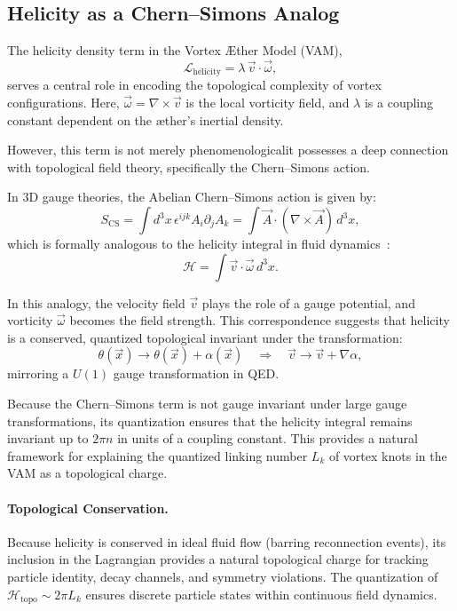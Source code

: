 \documentclass[12pt]{article}
\begin{document}
\subsection{Helicity as a Chern--Simons Analog}
The helicity density term in the Vortex \AE{}ther Model (VAM),
\begin{equation}
\mathcal{L}_{\text{helicity}} = \lambda\, \vec{v} \cdot \vec{\omega},
\end{equation}
serves a central role in encoding the topological complexity of vortex configurations. Here, $\vec{\omega} = \nabla \times \vec{v}$ is the local vorticity field, and $\lambda$ is a coupling constant dependent on the \ae{}ther's inertial density.

However, this term is not merely phenomenological\textemdash it possesses a deep connection with topological field theory, specifically the Chern--Simons action.

In 3D gauge theories, the Abelian Chern--Simons action is given by:
\begin{equation}
S_{\text{CS}} = \int d^3x\, \epsilon^{ijk} A_i \partial_j A_k = \int \vec{A} \cdot (\nabla \times \vec{A})\, d^3x,
\end{equation}
which is formally analogous to the helicity integral in fluid dynamics~\cite{moffatt1969degree, jackiw1990chern}:
\begin{equation}
\mathcal{H} = \int \vec{v} \cdot \vec{\omega}\, d^3x.
\end{equation}

In this analogy, the velocity field $\vec{v}$ plays the role of a gauge potential, and vorticity $\vec{\omega}$ becomes the field strength. This correspondence suggests that helicity is a conserved, quantized topological invariant under the transformation:
\begin{equation}
\theta(\vec{x}) \rightarrow \theta(\vec{x}) + \alpha(\vec{x}) \quad \Rightarrow \quad \vec{v} \rightarrow \vec{v} + \nabla \alpha,
\end{equation}
mirroring a $U(1)$ gauge transformation in QED.

Because the Chern--Simons term is not gauge invariant under large gauge transformations, its quantization ensures that the helicity integral remains invariant up to $2\pi n$ in units of a coupling constant. This provides a natural framework for explaining the quantized linking number $L_k$ of vortex knots in the VAM as a topological charge.

\paragraph{Topological Conservation.}
Because helicity is conserved in ideal fluid flow (barring reconnection events), its inclusion in the Lagrangian provides a natural topological charge for tracking particle identity, decay channels, and symmetry violations. The quantization of $\mathcal{H}_\text{topo} \sim 2\pi L_k$ ensures discrete particle states within continuous field dynamics.
\end{document}
